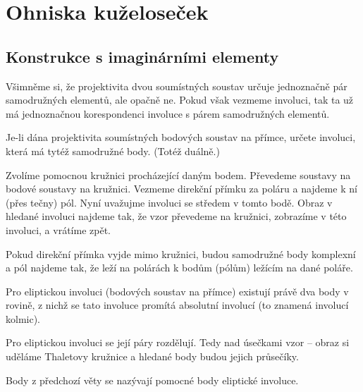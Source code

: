\documentclass[12pt]{article}					%
\begin{document}

\section{Ohniska kuželoseček}
\subsection{Konstrukce s imaginárními elementy}
\begin{poznamka}
	Všimněme si, že projektivita dvou soumístných soustav určuje jednoznačně pár samodružných elementů, ale opačně ne. Pokud však vezmeme involuci, tak ta už má jednoznačnou korespondenci involuce s párem samodružných elementů.
\end{poznamka}

\begin{priklad}[Konstrukce]
	Je-li dána projektivita soumístných bodových soustav na přímce, určete involuci, která má tytéž samodružné body. (Totéž duálně.)

	\begin{reseni}[Duální]
		Zvolíme pomocnou kružnici procházející daným bodem. Převedeme soustavy na bodové soustavy na kružnici. Vezmeme direkční přímku za poláru a najdeme k ní (přes tečny) pól. Nyní uvažujme involuci se středem v tomto bodě. Obraz v hledané involuci najdeme tak, že vzor převedeme na kružnici, zobrazíme v této involuci, a vrátíme zpět.
	\end{reseni}

	\begin{poznamkain}
		Pokud direkční přímka vyjde mimo kružnici, budou samodružné body komplexní a pól najdeme tak, že leží na polárách k bodům (pólům) ležícím na dané poláře.
	\end{poznamkain}
\end{priklad}

\begin{veta}
	Pro eliptickou involuci (bodových soustav na přímce) existují právě dva body v rovině, z nichž se tato involuce promítá absolutní involucí (to znamená involucí kolmic).
	
	\begin{dukazin}
		Pro eliptickou involuci se její páry rozdělují. Tedy nad úsečkami vzor – obraz si uděláme Thaletovy kružnice a hledané body budou jejich průsečíky.
	\end{dukazin}
\end{veta}

\begin{definice}
	Body z předchozí věty se nazývají pomocné body eliptické involuce.
\end{definice}
\end{document}
